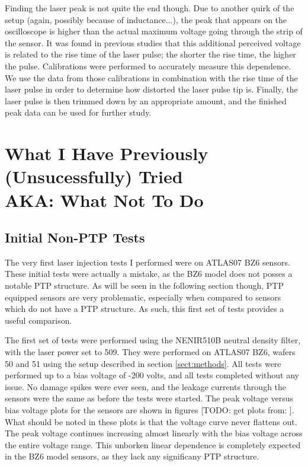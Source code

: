 \documentclass{report}
\begin{document}
            Finding the laser peak is not quite the end though. Due to another quirk of the setup (again, possibly because of inductance...), the peak that appears on the oscilloscope is higher than the actual maximum voltage going through the strip of the sensor. It was found in previous studies that this additional perceived voltage is related to the rise time of the laser pulse; the shorter the rise time, the higher the pulse. Calibrations were performed to accurately measure this dependence. We use the data from those calibrations in combination with the rise time of the laser pulse in order to determine how distorted the laser pulse tip is. Finally, the laser pulse is then trimmed down by an appropriate amount, and the finished peak data can be used for further study.



    \chapter{ What I Have Previously (Unsucessfully) Tried\\ AKA: What Not To Do }
        \section{Initial Non-PTP Tests}
            The very first laser injection tests I performed were on ATLAS07 BZ6 sensors. These initial tests were actually a mistake, as the BZ6 model does not posses a notable PTP structure. As will be seen in the following section though, PTP equipped sensors are very problematic, especially when compared to sensors which do not have a PTP structure. As such, this first set of tests provides a useful comparison.

            The first set of tests were performed using the NENIR510B neutral density filter, with the laser power set to 509. They were performed on ATLAS07 BZ6, wafers 50 and 51 using the setup described in section \ref{sect:methods}. All tests were performed up to a bias voltage of -200 volts, and all tests completed without any issue. No damage spikes were ever seen, and the leakage currents through the sensors were the same as before the tests were started. The peak voltage versus bias voltage plots for the sensors are shown in figures [TODO: get plots from:
            ]. What should be noted in these plots is that the voltage curve never flattens out. The peak voltage continues increasing almost linearly with the bias voltage across the entire voltage range. This unborken linear dependence is completely expected in the BZ6 model sensors, as they lack any significany PTP structure.
\end{document}
